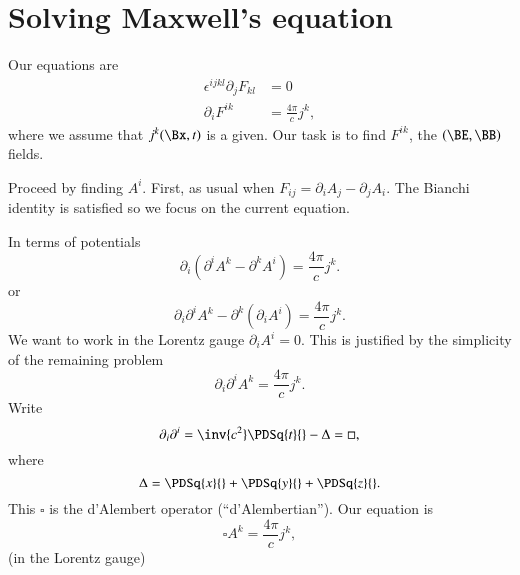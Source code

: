 %
%
\section{Solving Maxwell's equation}

Our equations are
%
\begin{equation}\label{eqn:relativisticElectrodynamicsL17b:210}
\begin{aligned}
\epsilon^{i j k l} \partial_j F_{k l} &= 0 \\
\partial_i F^{i k} &= \frac{4 \pi}{c} j^k,
\end{aligned}
\end{equation}
%
where we assume that \(j^k(\Bx, t)\) is a given.  Our task is to find \(F^{i k}\), the \((\BE, \BB)\) fields.

Proceed by finding \(A^i\).  First, as usual when \(F_{i j} = \partial_i A_j - \partial_j A_i\).  The Bianchi identity is satisfied so we focus on the current equation.

In terms of potentials
%
\begin{equation}\label{eqn:relativisticElectrodynamicsL17b:230}
\partial_i (\partial^i A^k - \partial^k A^i) = \frac{ 4 \pi}{c} j^k.
\end{equation}
%
or
%
\begin{equation}\label{eqn:relativisticElectrodynamicsL17b:250}
\partial_i \partial^i A^k - \partial^k (\partial_i A^i) = \frac{ 4 \pi}{c} j^k.
\end{equation}
%
We want to work in the Lorentz gauge \(\partial_i A^i = 0\).  This is justified by the simplicity of the remaining problem
%
\begin{equation}\label{eqn:relativisticElectrodynamicsL17b:270}
\partial_i \partial^i A^k = \frac{4 \pi}{c} j^k.
\end{equation}
%
Write
%
\begin{equation}\label{eqn:relativisticElectrodynamicsL17b:290}
\partial_i \partial^i = \inv{c^2} \PDSq{t}{} - \Delta = \square,
\end{equation}
where
\begin{equation}\label{eqn:relativisticElectrodynamicsL17b:291}
\Delta = \PDSq{x}{} + \PDSq{y}{} + \PDSq{z}{}.
\end{equation}
This \(\square\) is the d'Alembert operator (``d'Alembertian'').
Our equation is
%
\begin{equation}\label{eqn:relativisticElectrodynamicsL17b:310}
\square A^k = \frac{4 \pi}{c} j^k,
\end{equation}
(in the Lorentz gauge)

